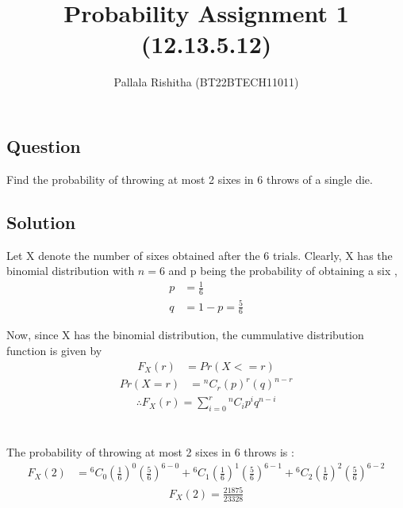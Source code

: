 \documentclass[12pt,twocolumn,notitlepage]{article}
\title{Probability Assignment 1 (12.13.5.12)}
\author{Pallala Rishitha (BT22BTECH11011)}
\date{}
\providecommand{\brak}[1]{\ensuremath{\left(#1\right)}}
\newcommand*{\comb}[2]{{}^{#1}C_{#2}}
\begin{document}
\maketitle
\subsection*{Question}
Find the probability of throwing at most 2 sixes in 6 throws of a single die.\\



\subsection*{Solution}

Let X denote the number of sixes obtained after the 6 trials. Clearly, X has the binomial distribution with $n=6$ and p being the probability of obtaining a six ,
\begin{align}
    p &= \frac{1}{6} \\ 
    q &=1-p = \frac{5}{6}     
\end{align}

Now, since X has the binomial distribution, the cummulative distribution function is given by
\begin{align}
    F_X\brak{r} &= Pr\brak{X<=r} 
\end{align}
\begin{align}
    Pr\brak{X=r} &= \comb{n}{r}\brak{p}^{r}\brak{q}^{n-r} 
\end{align}
\begin{align}
    \therefore   F_X(r)=\sum_{i=0}^r\comb{n}{i}p^iq^{n-i}
\end{align}
\\\\
The probability of throwing at most 2 sixes in 6 throws is :
\begin{align}
 F_X\brak{2} &= \comb{6}{0}\brak{\frac{1}{6}}^{0}\brak{\frac{5}{6}}^{6-0} +\comb{6}{1}\brak{\frac{1}{6}}^{1}\brak{\frac{5}{6}}^{6-1} + \comb{6}{2}\brak{\frac{1}{6}}^{2}\brak{\frac{5}{6}}^{6-2}
\end{align}
\begin{align}
  F_X\brak{2}   = \frac{21875}{23328} 
\end{align}

 
\end{document}

